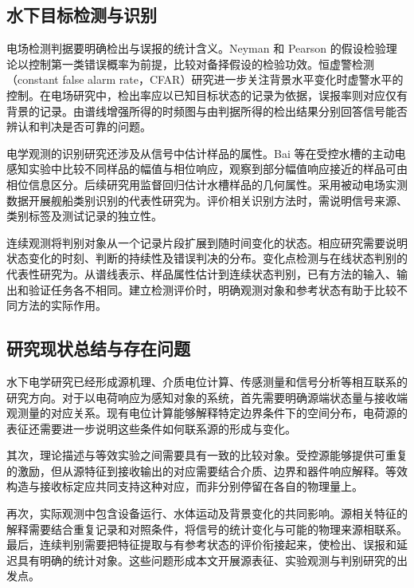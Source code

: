 \subsection{水下目标检测与识别}

电场检测判据要明确检出与误报的统计含义。Neyman 和 Pearson 的假设检验理论以控制第一类错误概率为前提，比较对备择假设的检验功效\cite{neymanPearson1933}。恒虚警检测（constant false alarm rate，CFAR）研究进一步关注背景水平变化时虚警水平的控制\cite{finnJohnson1968}。在电场研究中，检出率应以已知目标状态的记录为依据，误报率则对应仅有背景的记录。由谱线增强所得的时频图与由判据所得的检出结果分别回答信号能否辨认和判决是否可靠的问题。

电学观测的识别研究还涉及从信号中估计样品的属性。Bai 等在受控水槽的主动电感知实验中比较不同样品的幅值与相位响应，观察到部分幅值响应接近的样品可由相位信息区分\cite{bai2012}。后续研究用监督回归估计水槽样品的几何属性\cite{bai2015}。采用被动电场实测数据开展舰船类别识别的代表性研究为\underline{\hspace{5em}}。评价相关识别方法时，需说明信号来源、类别标签及测试记录的独立性。

连续观测将判别对象从一个记录片段扩展到随时间变化的状态。相应研究需要说明状态变化的时刻、判断的持续性及错误判决的分布。变化点检测与在线状态判别的代表性研究为\underline{\hspace{6em}}。从谱线表示、样品属性估计到连续状态判别，已有方法的输入、输出和验证任务各不相同。建立检测评价时，明确观测对象和参考状态有助于比较不同方法的实际作用。

\subsection{研究现状总结与存在问题}

水下电学研究已经形成源机理、介质电位计算、传感测量和信号分析等相互联系的研究方向。对于以电荷响应为感知对象的系统，首先需要明确源端状态量与接收端观测量的对应关系。现有电位计算能够解释特定边界条件下的空间分布，电荷源的表征还需要进一步说明这些条件如何联系源的形成与变化。

其次，理论描述与等效实验之间需要具有一致的比较对象。受控源能够提供可重复的激励，但从源特征到接收输出的对应需要结合介质、边界和器件响应解释。等效构造与接收标定应共同支持这种对应，而非分别停留在各自的物理量上。

再次，实际观测中包含设备运行、水体运动及背景变化的共同影响。源相关特征的解释需要结合重复记录和对照条件，将信号的统计变化与可能的物理来源相联系。最后，连续判别需要把特征提取与有参考状态的评价衔接起来，使检出、误报和延迟具有明确的统计对象。这些问题形成本文开展源表征、实验观测与判别研究的出发点。

